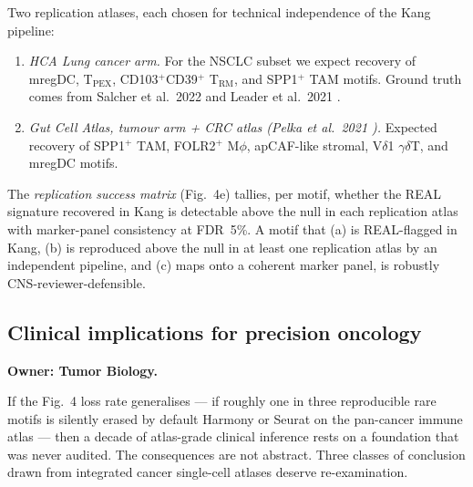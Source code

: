 Two replication atlases, each chosen for technical independence of the Kang pipeline:

\begin{enumerate}[leftmargin=*,itemsep=1pt,topsep=1pt]
  \item \emph{HCA Lung cancer arm.} For the NSCLC subset we expect recovery of mregDC, T$_\text{PEX}$, CD103$^+$CD39$^+$ T$_\text{RM}$, and SPP1$^+$ TAM motifs. Ground truth comes from Salcher et al.\ 2022 \citep{Salcher2022CancerCell} and Leader et al.\ 2021 \citep{Leader2021CancerCell}.
  \item \emph{Gut Cell Atlas, tumour arm + CRC atlas (Pelka et al.\ 2021 \citep{Pelka2021Cell}).} Expected recovery of SPP1$^+$ TAM, FOLR2$^+$ M$\phi$, apCAF-like stromal, V$\delta$1 $\gamma\delta$T, and mregDC motifs.
\end{enumerate}

The \emph{replication success matrix} (Fig.\ 4e) tallies, per motif, whether the REAL signature recovered in Kang is detectable above the null in each replication atlas with marker-panel consistency at FDR~5\%. A motif that (a) is REAL-flagged in Kang, (b) is reproduced above the null in at least one replication atlas by an independent pipeline, and (c) maps onto a coherent marker panel, is robustly CNS-reviewer-defensible.


\subsection*{Clinical implications for precision oncology}
\label{sec:disc-clinical}

\textbf{Owner: Tumor Biology.}

If the Fig.~4 loss rate generalises --- if roughly one in three reproducible rare motifs is silently erased by default Harmony or Seurat on the pan-cancer immune atlas --- then a decade of atlas-grade clinical inference rests on a foundation that was never audited. The consequences are not abstract. Three classes of conclusion drawn from integrated cancer single-cell atlases deserve re-examination.

